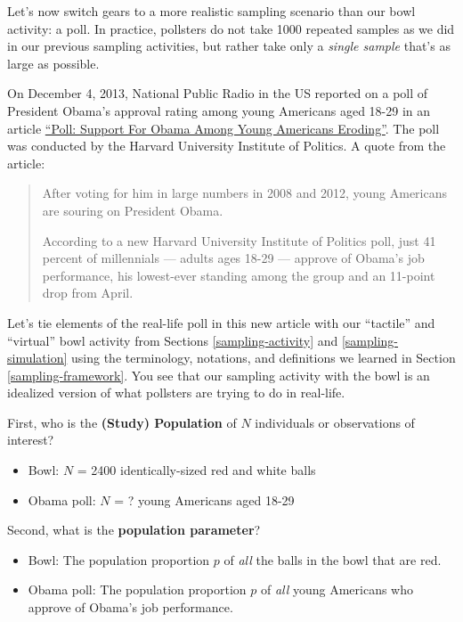 \documentclass[
]{book}
\providecommand{\tightlist}{%
  \setlength{\itemsep}{0pt}\setlength{\parskip}{0pt}}
\begin{document}
Let's now switch gears to a more realistic sampling scenario than our bowl activity: a poll. In practice, pollsters do not take 1000 repeated samples as we did in our previous sampling activities, but rather take only a \emph{single sample} that's as large as possible.

On December 4, 2013, National Public Radio in the US reported on a poll of President Obama's approval rating among young Americans aged 18-29 in an article \href{https://www.npr.org/sections/itsallpolitics/2013/12/04/248793753/poll-support-for-obama-among-young-americans-eroding}{``Poll: Support For Obama Among Young Americans Eroding''}. The poll was conducted by the Harvard University Institute of Politics. A quote from the article:

\begin{quote}
After voting for him in large numbers in 2008 and 2012, young Americans are souring on President Obama.

According to a new Harvard University Institute of Politics poll, just 41 percent of millennials --- adults ages 18-29 --- approve of Obama's job performance, his lowest-ever standing among the group and an 11-point drop from April.
\end{quote}

Let's tie elements of the real-life poll in this new article with our ``tactile'' and ``virtual'' bowl activity from Sections \ref{sampling-activity} and \ref{sampling-simulation} using the terminology, notations, and definitions we learned in Section \ref{sampling-framework}. You see that our sampling activity with the bowl is an idealized version of what pollsters are trying to do in real-life.

First, who is the \textbf{(Study) Population} of \(N\) individuals or observations of interest? 

\begin{itemize}
\tightlist
\item
  Bowl: \(N\) = 2400 identically-sized red and white balls
\item
  Obama poll: \(N\) = ? young Americans aged 18-29
\end{itemize}

Second, what is the \textbf{population parameter}? 

\begin{itemize}
\tightlist
\item
  Bowl: The population proportion \(p\) of \emph{all} the balls in the bowl that are red.
\item
  Obama poll: The population proportion \(p\) of \emph{all} young Americans who approve of Obama's job performance.
\end{itemize}
\end{document}
